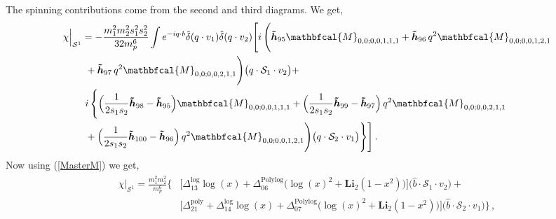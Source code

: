 The spinning contributions come from the second and third diagrams. We get,
\begin{align}
    \begin{split}
       & \chi\Big|_{\mathcal{S}^{1}}=-\frac{m_1^2 m_2^2 s_1^2  s_2^2}{32 m_p^6}\int e^{-i q\cdot b}\hat\delta(q\cdot v_1)\hat\delta(q\cdot v_2)\Bigg[i\,\Bigg(\boldsymbol{\tilde h}_{95}\mathbfcal{M}_{0,0;0,0,1,1,1}+\boldsymbol{\tilde h}_{96}\,q^2\mathbfcal{M}_{0,0;0,0,1,2,1}\\ &\hspace{0.8cm}+\boldsymbol{\tilde h}_{97}\,q^2\mathbfcal{M}_{0,0;0,0,2,1,1}\Bigg)\big(q\cdot\mathcal{S}_1\cdot v_2\big)+\\&\hspace{0.8cm}i\,\Bigg\{\Big(\frac{1}{2 s_1 s_2}\boldsymbol{\tilde h}_{98}-\boldsymbol{\tilde h}_{95}\Big)\mathbfcal{M}_{0,0;0,0,1,1,1}+\Big(\frac{1}{2 s_1 s_2}\boldsymbol{\tilde h}_{99}-\boldsymbol{\tilde h}_{97}\Big)\,q^2\mathbfcal{M}_{0,0;0,0,2,1,1}\\ &\hspace{0.8cm}+\Big(\frac{1}{2 s_1 s_2}\boldsymbol{\tilde h}_{100}-\boldsymbol{\tilde h}_{96}\Big)\,q^2\mathbfcal{M}_{0,0;0,0,1,2,1}\Bigg)\big(q\cdot\mathcal{S}_2\cdot v_1\big)\Bigg\}\Bigg]\,.
    \end{split}
\end{align}
Now using (\ref{MasterM}) we get, 
\begin{align}
    \begin{split} \label{eqt15}     \chi\Big|_{\mathcal{S}^{1}}=\frac{m_1^2m_2^2}{m_p^6}\Bigg\{&\Bigg[\Delta_{\mathfrak{13}}^{\textrm{log}}\log(x)+\Delta_{\mathfrak{06}}^{\textrm{Polylog}}\Big(\log(x)^2+ \textbf{Li}_2\left(1-x^2\right)\Big)\Bigg]\big(\hat{b}\cdot\mathcal{S}_1\cdot v_2\big)+\\&\Bigg[\Delta_{\mathfrak{21}}^{\textrm{poly}}+\Delta_{\mathfrak{14}}^{\textrm{log}}\log(x)+\Delta_{\mathfrak{07}}^{\textrm{Polylog}}\Big(\log(x)^2+ \textbf{Li}_2\left(1-x^2\right)\Big)\Bigg]\big(\hat{b}\cdot\mathcal{S}_2\cdot v_1\big)\Bigg\}\,,
         \end{split}
\end{align}
